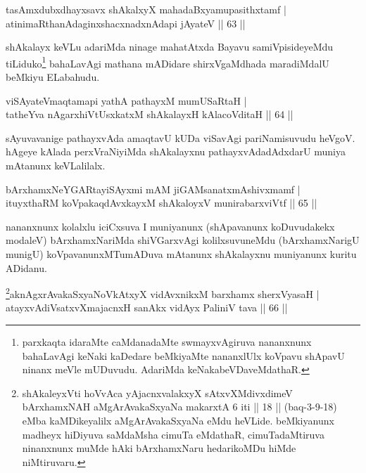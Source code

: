\begin{shl}
tasAmxdubxdhayxsavx shAkalxyX mahadaBxyamupasithxtamf |\\
atinimaRthanAdaginxshacxnadxnAdapi jAyateV \hfill || 63 ||
\end{shl}

\begin{artha}
shAkalayx keVLu adariMda ninage mahatAtxda Bayavu samiVpisideyeMdu tiLiduko\footnote{parxkaqta idaraMte caMdanadaMte swmayxvAgiruva nananxnunx bahaLavAgi keNaki kaDedare beMkiyaMte nananxlUlx koVpavu shApavU ninanx meVle mUDuvudu. AdariMda keNakabeVDaveMdathaR.} bahaLavAgi mathana mADidare shirxVgaMdhada maradiMdalU beMkiyu ELabahudu.
\end{artha}

\begin{shl}
viSAyateV\s maqtamapi yathA pathayxM mumUSaRtaH |\\
tatheYva nAgarxhiVtUsxkatxM shAkalayxH kAlacoVditaH \hfill || 64 ||
\end{shl}

\begin{artha}%
sAyuvavanige pathayxvAda amaqtavU kUDa viSavAgi pariNamisuvudu heVgoV. hAgeye kAlada perxVraNiyiMda shAkalayxnu pathayxvAdadAdxdarU muniya mAtanunx keVLalilalx.
\end{artha}


\begin{shl}
bArxhamxNeYGARtayiSAyxmi mAM jiGAMsanatxmAshivxmamf |\\
ituyxthaRM koVpakaqdAvxkayxM shAkaloyxV munirabarxviVtf \hfill || 65 ||
\end{shl}

\begin{artha}
nananxnunx kolalxlu iciCxsuva I muniyanunx (shApavanunx koDuvudakekx modaleV) bArxhamxNariMda shiVGarxvAgi kolilxsuvuneMdu (bArxhamxNarigU munigU) koVpavanunxMTumADuva mAtanunx shAkalayxnu muniyanunx kuritu ADidanu.
\end{artha}


\begin{shl}
\footnote{shAkaleyxVti hoVvAca yAjacnxvalakxyX sAtxvXMdivxdimeV bArxhamxNAH aMgArAvakaSxyaNa makarxtA 6 iti || 18 || (baq-3-9-18) eMba kaMDikeyalilx aMgArAvakaSxyaNa eMdu heVLide. beMkiyanunx madheyx hiDiyuva saMdaMsha cimuTa eMdathaR, cimuTadaMtiruva ninanxnunx muMde hAki bArxhamxNaru hedarikoMDu hiMde niMtiruvaru.}aknAgxrAvakaSxyaNoVkAtxyX vidAvxnikxM barxhamx sherxVyasaH |\\
atayxvAdiVsatxvXmajacnxH sanAkx vidAyx PaliniV tava \hfill || 66 ||
\end{shl}

